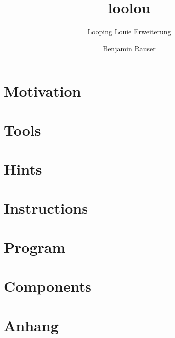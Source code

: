 \documentclass[a4paper]{scrartcl}
\begin{document}
	\author{Benjamin Rauser}
	\title{loolou}
	\subtitle{Looping Louie Erweiterung}

	
	\newpage

	\tableofcontents
	\newpage

	\section{Motivation}
	
	\newpage

	\section{Tools}
	

	\section{Hints}
	
	\newpage

	\section{Instructions}
	
	\newpage

	\section{Program}
	
	\newpage

	\section{Components}
	
	\newpage

	\listoffigures

	\listoftables

	\lstlistoflistings
	\newpage

	\section{Anhang}
	
\end{document}
